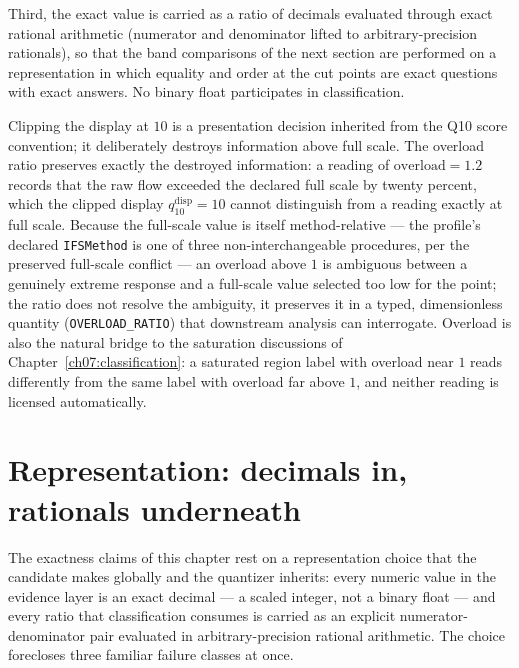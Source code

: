 Third, the exact value is carried as a ratio of decimals evaluated through
exact rational arithmetic (numerator and denominator lifted to arbitrary-precision
rationals), so that the band comparisons of the next section are performed
on a representation in which equality and order at the cut points are exact
questions with exact answers. No binary float participates in
classification.

\begin{remark}\label{ch08:rem:overload}
Clipping the display at $10$ is a presentation decision inherited from the
Q10 score convention; it deliberately destroys information above full
scale. The overload ratio preserves exactly the destroyed information: a
reading of $\mathrm{overload} = 1.2$ records that the raw flow exceeded the
declared full scale by twenty percent, which the clipped display
$q_{10}^{\mathrm{disp}} = 10$ cannot distinguish from a reading exactly at
full scale. Because the full-scale value is itself method-relative --- the
profile's declared \texttt{IFSMethod} is one of three non-interchangeable
procedures, per the preserved full-scale conflict --- an overload above $1$
is ambiguous between a genuinely extreme response and a full-scale value
selected too low for the point; the ratio does not resolve the ambiguity,
it preserves it in a typed, dimensionless quantity
(\texttt{OVERLOAD\_RATIO}) that downstream analysis can interrogate.
Overload is also the natural bridge to the saturation discussions of
Chapter~\ref{ch07:classification}: a saturated region label with overload
near $1$ reads differently from the same label with overload far above $1$,
and neither reading is licensed automatically.
\end{remark}

\section{Representation: decimals in, rationals underneath}\label{ch08:sec:representation}

The exactness claims of this chapter rest on a representation choice
that the candidate makes globally and the quantizer inherits: every
numeric value in the evidence layer is an exact decimal --- a scaled
integer, not a binary float --- and every ratio that classification
consumes is carried as an explicit numerator-denominator pair evaluated
in arbitrary-precision rational arithmetic. The choice forecloses three
familiar failure classes at once.


